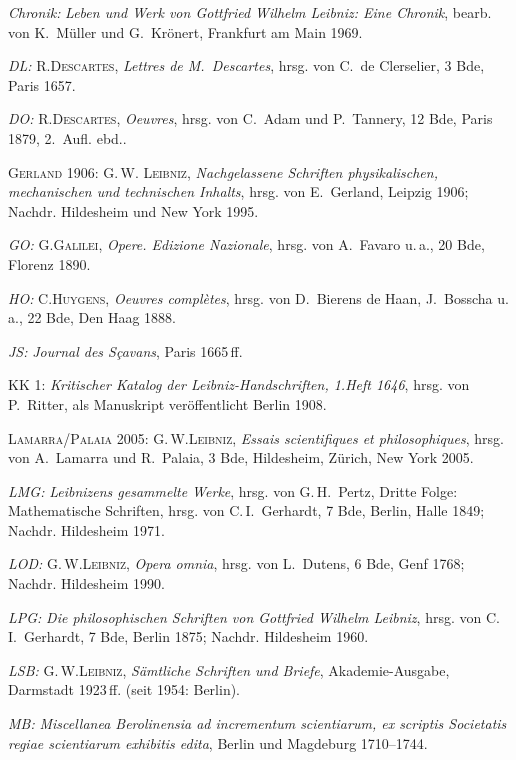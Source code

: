 \textit{Chronik:} \textit{Leben und Werk von Gottfried Wilhelm Leibniz: Eine Chronik}, bearb. von K.~Müller und G.~Krönert, Frankfurt am Main 1969.\par
\textit{DL:} R.\;\textsc{Descartes}, \textit{Lettres de M.~Descartes}, hrsg. von C.~de Clerselier, 3 Bde, Paris 1657.\par
\textit{DO:} R.\;\textsc{Descartes}, \textit{Oeuvres}, hrsg. von C.~Adam und P.~Tannery, 12 Bde, Paris 1879, 2.~Aufl. ebd..\par
\textsc{Gerland} 1906: G.\,W. \textsc{Leibniz}, \textit{Nachgelassene Schriften physikalischen, mechanischen und technischen Inhalts}, hrsg. von E.~Gerland, Leipzig 1906; Nachdr. Hildesheim und New York 1995.\par
\textit{GO:} G.\;\textsc{Galilei}, \textit{Opere. Edizione Nazionale}, hrsg. von A.~Favaro u.\,a., 20 Bde, Florenz 1890.\par
\textit{HO:} C.\;\textsc{Huygens}, \textit{Oeuvres complètes}, hrsg. von D.~Bierens de Haan, J.~Bosscha u.\,a., 22 Bde, Den Haag 1888.\par
\textit{JS:} \textit{Journal des Sçavans}, Paris 1665\,ff.\par
KK 1: \textit{Kritischer Katalog der Leibniz-Handschriften, 1.\;Heft 1646}, hrsg. von P.~Ritter, als Manuskript veröffentlicht Berlin 1908.\par
\textsc{Lamarra/Palaia} 2005: G.\,W.\;\textsc{Leibniz}, \textit{Essais scientifiques et philosophiques}, hrsg. von A.~Lamarra und R.~Palaia, 3 Bde, Hildesheim, Zürich, New York 2005.\par
\textit{LMG:} \textit{Leibnizens gesammelte Werke}, hrsg. von G.\,H.~Pertz, Dritte Folge: Mathematische Schriften, hrsg. von C.\,I.~Gerhardt, 7 Bde, Berlin, Halle 1849; Nachdr. Hildesheim 1971.\par
\textit{LOD:} G.\,W.\;\textsc{Leibniz}, \textit{Opera omnia}, hrsg. von L.~Dutens, 6 Bde, Genf 1768; Nachdr. Hildesheim 1990.\par
\textit{LPG:} \textit{Die philosophischen Schriften von Gottfried Wilhelm Leibniz}, hrsg. von C.\,I.~Gerhardt, 7 Bde, Berlin 1875; Nachdr. Hildesheim 1960.\par
\textit{LSB:} G.\,W.\;\textsc{Leibniz}, \textit{Sämtliche Schriften und Briefe}, Akademie-Ausgabe, Darmstadt 1923\,ff.
(seit 1954: Berlin).\par
\textit{MB:} \textit{Miscellanea Berolinensia ad incrementum scientiarum, ex scriptis Societatis regiae scientiarum exhibitis edita}, Berlin und Magdeburg 1710--1744.\par
